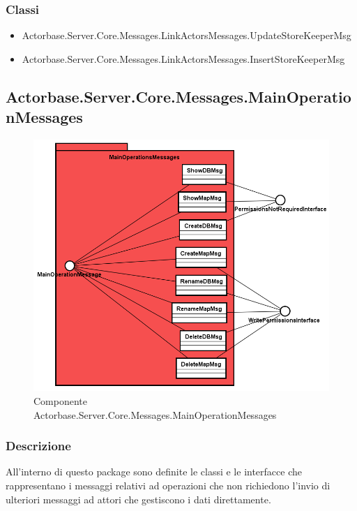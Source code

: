 \documentclass[a4paper]{article}
\begin{document}
			\subsubsection{Classi}
			\begin{itemize}
				\item Actorbase.Server.Core.Messages.LinkActorsMessages.UpdateStoreKeeperMsg
				\item Actorbase.Server.Core.Messages.LinkActorsMessages.InsertStoreKeeperMsg
			\end{itemize}
			
			\subsection{Actorbase.Server.Core.Messages.MainOperationMessages}
			\begin{figure} [H]
			\centering
			\includegraphics[scale=0.55]{Server/Package/MainOperationsMessagesLevel.png}
			\caption{Componente Actorbase.Server.Core.Messages.MainOperationMessages}
			\end{figure}
			\subsubsection{Descrizione}
				All'interno di questo package sono definite le classi e le interfacce che rappresentano i messaggi relativi ad operazioni che non richiedono l'invio di ulteriori messaggi ad attori che gestiscono i dati direttamente.
\end{document}
